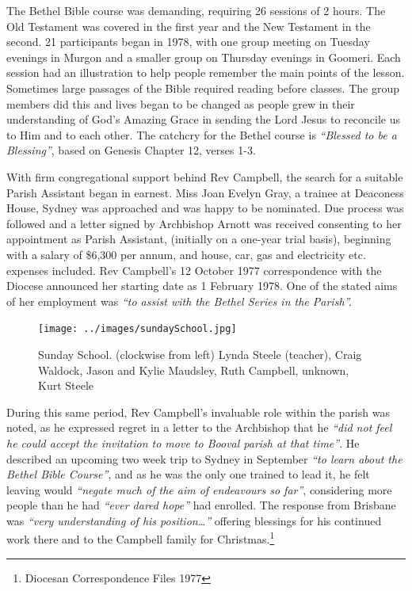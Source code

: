 The Bethel Bible course was demanding, requiring 26 sessions of 2  hours. The Old Testament was covered in the first year and the New Testament in the second. 21 participants began in 1978, with one group meeting on Tuesday evenings in Murgon and a smaller group on Thursday evenings in Goomeri. Each session had an illustration to help people remember the main points of the lesson. Sometimes large passages of the Bible required reading before classes. The group members did this and lives began to be changed as people grew in their understanding of God's Amazing Grace in sending the Lord Jesus to reconcile us to Him and to each other. The catchcry for the Bethel course is \emph{``Blessed to be a Blessing''}, based on Genesis Chapter 12, verses 1-3.



With firm congregational support behind Rev Campbell, the search for a suitable Parish Assistant began in earnest. Miss Joan Evelyn Gray, a trainee at Deaconess House, Sydney was approached and was happy to be nominated. Due process was followed and a letter signed by Archbishop Arnott was received consenting to her appointment as Parish Assistant, (initially on a one-year trial basis), beginning with a salary of \$6,300 per annum, and house, car, gas and electricity etc. expenses included. Rev Campbell's 12 October 1977 correspondence with the Diocese announced her starting date as 1 February 1978. One of the stated aims of her employment was \emph{``to assist with the Bethel Series in the Parish''.}









\begin{figure}[!htb]
\begin{center}
\texttt{[image: ../images/sundaySchool.jpg]}
\caption{Sunday School. (clockwise from left) Lynda Steele (teacher), Craig Waldock, Jason and Kylie Maudsley, Ruth Campbell, unknown, Kurt Steele}
\end{center}
\end{figure}




During this same period, Rev Campbell's invaluable role within the parish was noted, as he expressed regret in a letter to the Archbishop that he \emph{``did not feel he could accept the invitation to move to Booval parish at that time''}. He described an upcoming two week trip to Sydney in September \emph{``to learn about the Bethel Bible Course''}, and as he was the only one trained to lead it, he felt leaving would \emph{``negate much of the aim of endeavours so far''}, considering more people than he had \emph{``ever dared hope''} had enrolled. The response from Brisbane was \emph{``very understanding of his position\ldots''} offering blessings for his continued work there and to the Campbell family for Christmas.\footnote{Diocesan Correspondence Files 1977}


